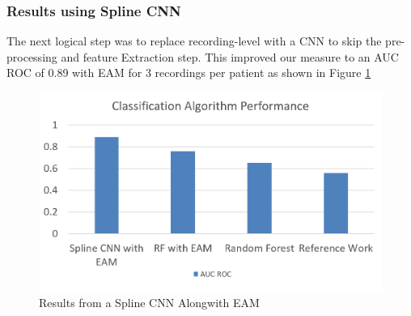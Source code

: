 \subsubsection{Results using Spline CNN}
The next logical step was to replace recording-level with a CNN to skip the pre-processing and feature Extraction step. This improved our measure to an AUC ROC of 0.89 with EAM for 3 recordings per patient as shown in Figure \ref{fig:third_res}
\begin{figure}[htbp]
  \centering
  \includegraphics[width=\textwidth]{./Figures/third_res.png}
  \caption{Results from a Spline CNN Alongwith EAM}
  \label{fig:third_res}
\end{figure}
